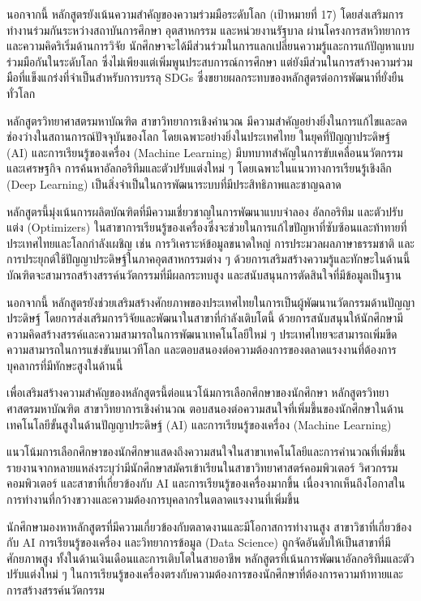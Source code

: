 นอกจากนี้ หลักสูตรยังเน้นความสำคัญของความร่วมมือระดับโลก (เป้าหมายที่ 17) โดยส่งเสริมการทำงานร่วมกันระหว่างสถาบันการศึกษา อุตสาหกรรม และหน่วยงานรัฐบาล ผ่านโครงการสหวิทยาการและความคิดริเริ่มด้านการวิจัย นักศึกษาจะได้มีส่วนร่วมในการแลกเปลี่ยนความรู้และการแก้ปัญหาแบบร่วมมือกันในระดับโลก ซึ่งไม่เพียงแต่เพิ่มพูนประสบการณ์การศึกษา แต่ยังมีส่วนในการสร้างความร่วมมือที่แข็งแกร่งที่จำเป็นสำหรับการบรรลุ SDGs ซึ่งขยายผลกระทบของหลักสูตรต่อการพัฒนาที่ยั่งยืนทั่วโลก

หลักสูตรวิทยาศาสตรมหาบัณฑิต สาขาวิทยาการเชิงคำนวณ มีความสำคัญอย่างยิ่งในการแก้ไขและลดช่องว่างในสถานการณ์ปัจจุบันของโลก โดยเฉพาะอย่างยิ่งในประเทศไทย ในยุคที่ปัญญาประดิษฐ์ (AI) และการเรียนรู้ของเครื่อง (Machine Learning) มีบทบาทสำคัญในการขับเคลื่อนนวัตกรรมและเศรษฐกิจ การค้นหาอัลกอริทึมและตัวปรับแต่งใหม่ ๆ โดยเฉพาะในแนวทางการเรียนรู้เชิงลึก (Deep Learning) เป็นสิ่งจำเป็นในการพัฒนาระบบที่มีประสิทธิภาพและชาญฉลาด

หลักสูตรนี้มุ่งเน้นการผลิตบัณฑิตที่มีความเชี่ยวชาญในการพัฒนาแบบจำลอง อัลกอริทึม และตัวปรับแต่ง (Optimizers) ในสาขาการเรียนรู้ของเครื่องซึ่งจะช่วยในการแก้ไขปัญหาที่ซับซ้อนและท้าทายที่ประเทศไทยและโลกกำลังเผชิญ เช่น การวิเคราะห์ข้อมูลขนาดใหญ่ การประมวลผลภาษาธรรมชาติ และการประยุกต์ใช้ปัญญาประดิษฐ์ในภาคอุตสาหกรรมต่าง ๆ ด้วยการเสริมสร้างความรู้และทักษะในด้านนี้ บัณฑิตจะสามารถสร้างสรรค์นวัตกรรมที่มีผลกระทบสูง และสนับสนุนการตัดสินใจที่มีข้อมูลเป็นฐาน

นอกจากนี้ หลักสูตรยังช่วยเสริมสร้างศักยภาพของประเทศไทยในการเป็นผู้พัฒนานวัตกรรมด้านปัญญาประดิษฐ์ โดยการส่งเสริมการวิจัยและพัฒนาในสาขาที่กำลังเติบโตนี้ ด้วยการสนับสนุนให้นักศึกษามีความคิดสร้างสรรค์และความสามารถในการพัฒนาเทคโนโลยีใหม่ ๆ ประเทศไทยจะสามารถเพิ่มขีดความสามารถในการแข่งขันบนเวทีโลก และตอบสนองต่อความต้องการของตลาดแรงงานที่ต้องการบุคลากรที่มีทักษะสูงในด้านนี้

เพื่อเสริมสร้างความสำคัญของหลักสูตรนี้ต่อแนวโน้มการเลือกศึกษาของนักศึกษา หลักสูตรวิทยาศาสตรมหาบัณฑิต สาขาวิทยาการเชิงคำนวณ ตอบสนองต่อความสนใจที่เพิ่มขึ้นของนักศึกษาในด้านเทคโนโลยีขั้นสูงในด้านปัญญาประดิษฐ์ (AI) และการเรียนรู้ของเครื่อง (Machine Learning)

แนวโน้มการเลือกศึกษาของนักศึกษาแสดงถึงความสนใจในสาขาเทคโนโลยีและการคำนวณที่เพิ่มขึ้น รายงานจากหลายแหล่งระบุว่ามีนักศึกษาสมัครเข้าเรียนในสาขาวิทยาศาสตร์คอมพิวเตอร์ วิศวกรรมคอมพิวเตอร์ และสาขาที่เกี่ยวข้องกับ AI และการเรียนรู้ของเครื่องมากขึ้น เนื่องจากเห็นถึงโอกาสในการทำงานที่กว้างขวางและความต้องการบุคลากรในตลาดแรงงานที่เพิ่มขึ้น

นักศึกษามองหาหลักสูตรที่มีความเกี่ยวข้องกับตลาดงานและมีโอกาสการทำงานสูง สาขาวิชาที่เกี่ยวข้องกับ AI การเรียนรู้ของเครื่อง และวิทยาการข้อมูล (Data Science) ถูกจัดอันดับให้เป็นสาขาที่มีศักยภาพสูง ทั้งในด้านเงินเดือนและการเติบโตในสายอาชีพ หลักสูตรที่เน้นการพัฒนาอัลกอริทึมและตัวปรับแต่งใหม่ ๆ ในการเรียนรู้ของเครื่องตรงกับความต้องการของนักศึกษาที่ต้องการความท้าทายและการสร้างสรรค์นวัตกรรม

